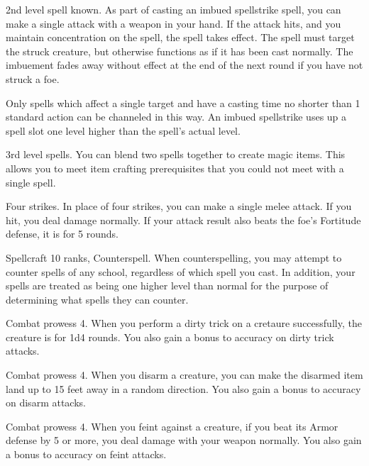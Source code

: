 \featpre 2nd level spell known.
\featben As part of casting an imbued spellstrike spell, you can make a single attack with a weapon in your hand.
If the attack hits, and you maintain concentration on the spell, the spell takes effect.
The spell must target the struck creature, but otherwise functions as if it has been cast normally.
The imbuement fades away without effect at the end of the next round if you have not struck a foe.

Only spells which affect a single target and have a casting time no shorter than 1 standard action can be channeled in this way.
An imbued spellstrike uses up a spell slot one level higher than the spell's actual level.

\featpre 3rd level spells.
\featben You can blend two spells together to create magic items.
This allows you to meet item crafting prerequisites that you could not meet with a single spell.

\featpre Four strikes.
\featben In place of four strikes, you can make a single melee attack.
If you hit, you deal damage normally.
If your attack result also beats the foe's Fortitude defense, it is \immobilized for 5 rounds.

\featpres Spellcraft 10 ranks, Counterspell.
\featben When counterspelling, you may attempt to counter spells of any school, regardless of which spell you cast.
In addition, your spells are treated as being one higher level than normal for the purpose of determining what spells they can counter.

\featpre Combat prowess 4.
\featben When you perform a dirty trick on a cretaure successfully, the creature is \impaired for 1d4 rounds.
You also gain a  bonus to accuracy on dirty trick attacks.

\featpre Combat prowess 4.
\featben When you disarm a creature, you can make the disarmed item land up to 15 feet away in a random direction.
You also gain a  bonus to accuracy on disarm attacks.

\featpre Combat prowess 4.
\featben When you feint against a creature, if you beat its Armor defense by 5 or more, you deal damage with your weapon normally.
You also gain a  bonus to accuracy on feint attacks.

